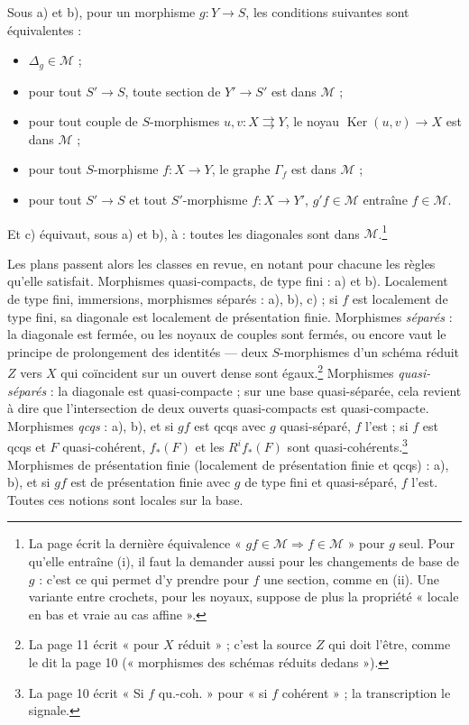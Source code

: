 \documentclass[11pt,a4paper]{article}
\begin{document}
Sous a) et b), pour un morphisme $g : Y \to S$, les conditions suivantes sont
équivalentes :

\begin{itemize}
  \item[(i)] $\Delta_g \in \mathcal{M}$ ;
  \item[(ii)] pour tout $S' \to S$, toute section de $Y' \to S'$ est dans
  $\mathcal{M}$ ;
  \item[(iii)] pour tout couple de $S$-morphismes $u, v : X \rightrightarrows Y$,
  le noyau $\operatorname{Ker}(u, v) \to X$ est dans $\mathcal{M}$ ;
  \item[(iv)] pour tout $S$-morphisme $f : X \to Y$, le graphe $\Gamma_f$ est
  dans $\mathcal{M}$ ;
  \item[(v)] pour tout $S' \to S$ et tout $S'$-morphisme $f : X \to Y'$,
  $g'f \in \mathcal{M}$ entraîne $f \in \mathcal{M}$.
\end{itemize}

Et c) équivaut, sous a) et b), à : toutes les diagonales sont dans
$\mathcal{M}$.\footnote{La page écrit la dernière équivalence
« $gf \in \mathcal{M} \Rightarrow f \in \mathcal{M}$ » pour $g$ seul. Pour
qu'elle entraîne (i), il faut la demander aussi pour les changements de base de
$g$ : c'est ce qui permet d'y prendre pour $f$ une section, comme en (ii). Une
variante entre crochets, pour les noyaux, suppose de plus la propriété
« locale en bas et vraie au cas affine ».}

Les plans passent alors les classes en revue, en notant pour chacune les règles
qu'elle satisfait. Morphismes quasi-compacts, de type fini : a) et b).
Localement de type fini, immersions, morphismes séparés : a), b), c) ; si $f$
est localement de type fini, sa diagonale est localement de présentation finie.
Morphismes \emph{séparés} : la diagonale est fermée, ou les noyaux de couples
sont fermés, ou encore vaut le principe de prolongement des identités --- deux
$S$-morphismes d'un schéma réduit $Z$ vers $X$ qui coïncident sur un ouvert
dense sont égaux.\footnote{La page 11 écrit « pour $X$ réduit » ; c'est la
source $Z$ qui doit l'être, comme le dit la page 10 (« morphismes des schémas
réduits dedans »).} Morphismes \emph{quasi-séparés} : la diagonale est
quasi-compacte ; sur une base quasi-séparée, cela revient à dire que
l'intersection de deux ouverts quasi-compacts est quasi-compacte. Morphismes
\emph{qcqs} : a), b), et si $gf$ est qcqs avec $g$ quasi-séparé, $f$ l'est ;
si $f$ est qcqs et $F$ quasi-cohérent, $f_*(F)$ et les $R^i f_*(F)$ sont
quasi-cohérents.\footnote{La page 10 écrit « Si $f$ qu.-coh. » pour « si $f$
cohérent » ; la transcription le signale.} Morphismes de présentation finie
(localement de présentation finie et qcqs) : a), b), et si $gf$ est de
présentation finie avec $g$ de type fini et quasi-séparé, $f$ l'est. Toutes ces
notions sont locales sur la base.
\end{document}
